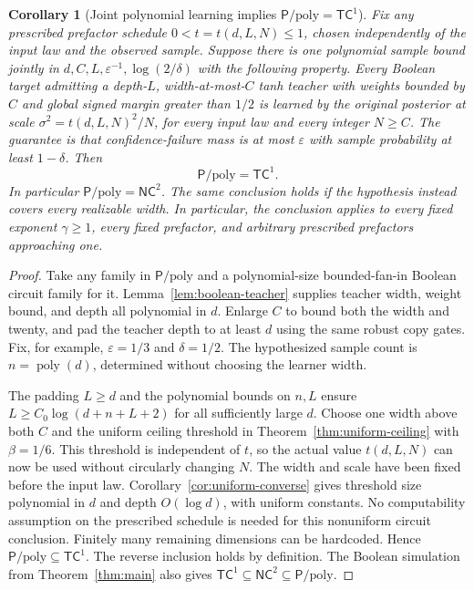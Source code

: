 \documentclass[11pt]{article}
\newtheorem{corollary}[theorem]{Corollary}
\theoremstyle{remark}
\newcommand{\poly}{\operatorname{poly}}
\newcommand{\TC}{\mathsf{TC}}
\newcommand{\NC}{\mathsf{NC}}
\newcommand{\Ppoly}{\mathsf{P}/\mathrm{poly}}
\begin{document}
\begin{corollary}[Joint polynomial learning implies $\Ppoly=\TC^1$]
\label{cor:collapse}
Fix any prescribed prefactor schedule $0<t=t(d,L,N)\le1$,
chosen independently of the input law and the observed sample.
Suppose there is one polynomial sample bound jointly
in $d,C,L,\varepsilon^{-1},\log(2/\delta)$ with the following property.
Every Boolean target admitting a depth-$L$, width-at-most-$C$ tanh
teacher with weights bounded by $C$ and global signed margin greater
than $1/2$ is learned by the original posterior at scale
$\sigma^2=t(d,L,N)^2/N$, for every input law and every integer
$N\ge C$. The guarantee is that confidence-failure mass is at most
$\varepsilon$ with sample probability at least $1-\delta$.
Then
\[
 \boxed{\qquad\Ppoly=\TC^1.\qquad}
\]
In particular $\Ppoly=\NC^2$. The same conclusion holds if the
hypothesis instead covers every realizable width.
In particular, the conclusion applies to every fixed exponent
$\gamma\ge1$, every fixed prefactor, and arbitrary prescribed
prefactors approaching one.
\end{corollary}
\begin{proof}
Take any family in $\Ppoly$ and a polynomial-size bounded-fan-in
Boolean circuit family for it. Lemma~\ref{lem:boolean-teacher}
supplies teacher width, weight bound, and depth all polynomial in $d$.
Enlarge $C$ to bound both the width and twenty, and pad the teacher
depth to at least $d$ using the same robust copy gates. Fix, for example,
$\varepsilon=1/3$ and $\delta=1/2$. The hypothesized sample count is
$n=\poly(d)$, determined without choosing the learner width.

The padding $L\ge d$ and the polynomial bounds on
$n,L$ ensure $L\ge C_0\log(d+n+L+2)$ for all sufficiently large
$d$. Choose one width above both $C$ and the uniform ceiling
threshold in Theorem~\ref{thm:uniform-ceiling} with $\beta=1/6$.
This threshold is independent of $t$, so the actual value
$t(d,L,N)$ can now be used without circularly changing $N$.
The width and scale have been fixed before the input law.
Corollary~\ref{cor:uniform-converse} gives threshold size
polynomial in $d$ and depth $O(\log d)$, with uniform constants.
No computability assumption on the prescribed schedule is
needed for this nonuniform circuit conclusion.
Finitely many remaining dimensions can be
hardcoded. Hence $\Ppoly\subseteq\TC^1$. The reverse
inclusion holds by definition. The Boolean simulation from
Theorem~\ref{thm:main} also gives
$\TC^1\subseteq\NC^2\subseteq\Ppoly$.
\end{proof}
\end{document}
